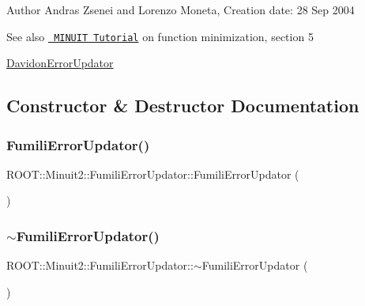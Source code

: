\begin{DoxyAuthor}{Author}
Andras Zsenei and Lorenzo Moneta, Creation date\+: 28 Sep 2004
\end{DoxyAuthor}
\begin{DoxySeeAlso}{See also}
\href{http://www.cern.ch/winkler/minuit/tutorial/mntutorial.pdf}{\texttt{ M\+I\+N\+U\+IT Tutorial}} on function minimization, section 5

\mbox{\hyperlink{classROOT_1_1Minuit2_1_1DavidonErrorUpdator}{Davidon\+Error\+Updator}} 
\end{DoxySeeAlso}


\subsection{Constructor \& Destructor Documentation}
\mbox{\label{classROOT_1_1Minuit2_1_1FumiliErrorUpdator_a6f6a3c5b10d58710f4d26b431e89907b}} 
\subsubsection{\texorpdfstring{FumiliErrorUpdator()}{FumiliErrorUpdator()}\hspace{0.1cm}{\footnotesize\ttfamily [1/3]}}
{\footnotesize\ttfamily R\+O\+O\+T\+::\+Minuit2\+::\+Fumili\+Error\+Updator\+::\+Fumili\+Error\+Updator (\begin{DoxyParamCaption}{ }\end{DoxyParamCaption})\hspace{0.3cm}{\ttfamily [inline]}}

\mbox{\label{classROOT_1_1Minuit2_1_1FumiliErrorUpdator_a601351a2ef04f881819b0115f88696e5}} 
\subsubsection{\texorpdfstring{$\sim$FumiliErrorUpdator()}{~FumiliErrorUpdator()}\hspace{0.1cm}{\footnotesize\ttfamily [1/3]}}
{\footnotesize\ttfamily R\+O\+O\+T\+::\+Minuit2\+::\+Fumili\+Error\+Updator\+::$\sim$\+Fumili\+Error\+Updator (\begin{DoxyParamCaption}{ }\end{DoxyParamCaption})\hspace{0.3cm}{\ttfamily [inline]}}

